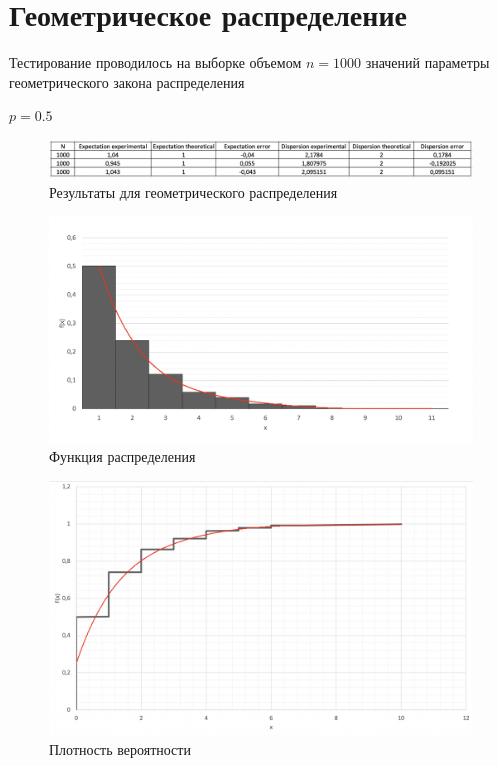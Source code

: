 \documentclass{article}
\begin{document}
	\section{Геометрическое распределение}
		Тестирование проводилось на выборке объемом $n = 1000$ значений параметры геометрического закона распределения
		\begin{center}
			$p = 0.5$\\
		\end{center}
		\begin{center}
			\begin{figure}[!htb]
				\includegraphics[scale = 0.5]{geom/3.png}
				\caption{Результаты для геометрического распределения}
			\end{figure}
		\end{center}
		
		\begin{figure}[!htb]
		    \includegraphics[scale = 0.34]{geom/2.png}
    		\caption{Функция распределения}
		\end{figure}
		 	 	
		\begin{figure}[!htb]
			\includegraphics[scale = 0.32]{geom/1.png}
			\caption{Плотность вероятности}
   		\end{figure}
   	\newpage
	
\end{document}
